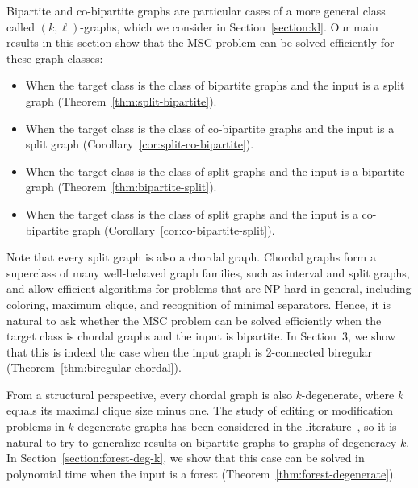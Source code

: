 \documentclass[11pt]{article}
\theoremstyle{definition}
\begin{document}
Bipartite and co-bipartite graphs are particular cases of a more general class called $(k, \ell)$-graphs, which we consider in Section~\ref{section:kl}.  
Our main results in this section show that the MSC problem can be solved efficiently for these graph classes:

\begin{itemize}
    \item When the target class is the class of bipartite graphs and the input is a split graph (Theorem~\ref{thm:split-bipartite}).
    \item When the target class is the class of co-bipartite graphs and the input is a split graph (Corollary~\ref{cor:split-co-bipartite}).
    \item When the target class is the class of split graphs and the input is a bipartite graph (Theorem~\ref{thm:bipartite-split}).
    \item When the target class is the class of split graphs and the input is a co-bipartite graph (Corollary~\ref{cor:co-bipartite-split}).
\end{itemize}

Note that every split graph is also a chordal graph.  
Chordal graphs form a superclass of many well-behaved graph families, such as interval and split graphs, and allow efficient algorithms for problems that are NP-hard in general, including coloring, maximum clique, and recognition of minimal separators.  
Hence, it is natural to ask whether the MSC problem can be solved efficiently when the target class is chordal graphs and the input is bipartite.  
In Section~3, we show that this is indeed the case when the input graph is 2-connected biregular (Theorem~\ref{thm:biregular-chordal}). 


From a structural perspective, every chordal graph is also $k$-degenerate, where $k$ equals its maximal clique size minus one.  
The study of editing or modification problems in $k$-degenerate graphs has been considered in the literature~\cite{Mathieson2010}, so it is natural to try to generalize results on bipartite graphs to graphs of degeneracy $k$.  
In Section~\ref{section:forest-deg-k}, we show that this case can be solved in polynomial time when the input is a forest (Theorem~\ref{thm:forest-degenerate}).
\end{document}
